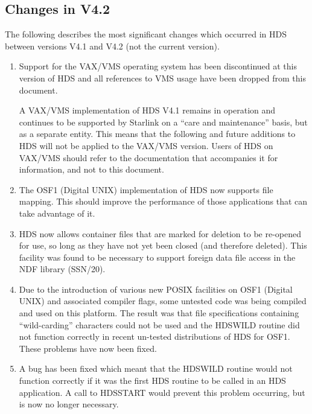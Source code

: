 \documentclass[twoside,11pt]{article}
\newcommand{\htmlref}[2]{#1}
\newcommand{\xref}[3]{#1}
\renewcommand{\_}{\texttt{\symbol{95}}}
\newcommand{\qt}[1]{``#1''}
\newcommand{\qt}[1]{{\tt{"}}#1{\tt{"}}}
\begin{document}
\subsection{Changes in V4.2}

The following describes the most significant changes which occurred in HDS
between versions V4.1 and V4.2 (not the current version).

\begin{enumerate}

\item Support for the VAX/VMS operating system has been discontinued
at this version of HDS and all references to VMS usage have been
dropped from this document.

A VAX/VMS implementation of HDS V4.1 remains in operation and
continues to be supported by Starlink on a \qt{care and maintenance}
basis, but as a separate entity. This means that the following and
future additions to HDS will not be applied to the VAX/VMS
version. Users of HDS on VAX/VMS should refer to the documentation
that accompanies it for information, and not to this document.

\item The OSF1 (Digital UNIX) implementation of HDS now supports file
mapping. This should improve the performance of those applications
that can take advantage of it.

\item HDS now allows container files that are marked for deletion to
be re-opened for use, so long as they have not yet been closed (and
therefore deleted). This facility was found to be necessary to support
foreign data file access in the NDF library (\xref{SSN/20}{ssn20}{}).

\item Due to the introduction of various new POSIX facilities on OSF1
(Digital UNIX) and associated compiler flags, some untested code was
being compiled and used on this platform. The result was that file
specifications containing \qt{wild-carding} characters could not be
used and the \htmlref{HDS\_WILD}{HDS_WILD} routine did not function
correctly in recent un-tested distributions of HDS for OSF1. These
problems have now been fixed.

\item A bug has been fixed which meant that the
\htmlref{HDS\_WILD}{HDS_WILD} routine would not function correctly if
it was the first HDS routine to be called in an HDS application. A
call to \htmlref{HDS\_START}{HDS_START} would prevent this problem
occurring, but is now no longer necessary.


\end{enumerate}
\end{document}
